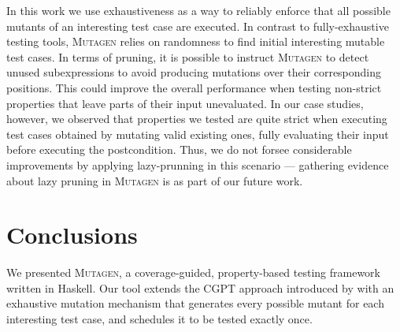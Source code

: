 \documentclass[sigconf, anonymous, review]{acmart}
\newcommand{\mutagen}{\textsc{Mutagen}\xspace}
\begin{document}
In this work we use exhaustiveness as a way to reliably enforce that all
possible mutants of an interesting test case are executed.
%
In contrast to fully-exhaustive testing tools, \mutagen relies on randomness to
find initial interesting mutable test cases.
%
In terms of pruning, it is possible to instruct \mutagen to detect unused
subexpressions to avoid producing mutations over their corresponding positions.
%
This could improve the overall performance when testing non-strict properties
that leave parts of their input unevaluated.
%
In our case studies, however, we observed that properties we tested
are quite strict when executing test cases obtained by mutating valid existing ones,
fully evaluating their input before executing the postcondition.
%
Thus, we do not forsee considerable improvements by applying lazy-prunning in
this scenario --- gathering evidence about lazy pruning in \mutagen is as part
of our future work.




\section{Conclusions}
\label{sec:conclusions}

We presented \mutagen, a coverage-guided, property-based testing framework
written in Haskell.
%
%
Our tool extends the CGPT approach introduced by
\citeauthor{lampropoulos2019coverage} with an exhaustive mutation mechanism that
generates every possible mutant for each interesting test case, and schedules it
to be tested exactly once.


\end{document}
